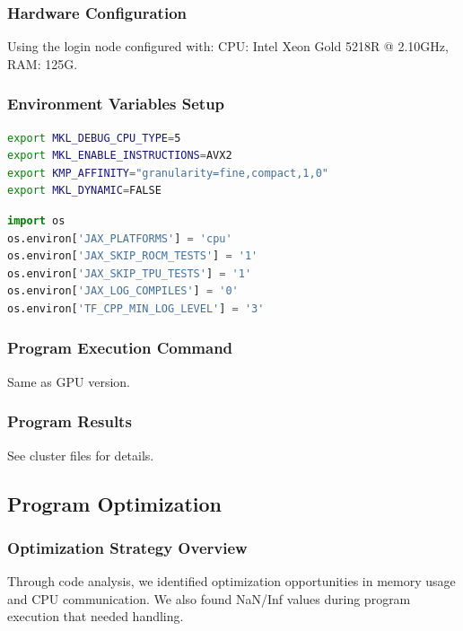 \documentclass[a4paper,12pt]{article}
\begin{document}
\subsubsection{Hardware Configuration}
Using the login node configured with: CPU: Intel Xeon Gold 5218R @ 2.10GHz, RAM: 125G.

\subsubsection{Environment Variables Setup}
\begin{lstlisting}[language=bash]
export MKL_DEBUG_CPU_TYPE=5
export MKL_ENABLE_INSTRUCTIONS=AVX2
export KMP_AFFINITY="granularity=fine,compact,1,0"
export MKL_DYNAMIC=FALSE
\end{lstlisting}
\begin{lstlisting}[language=python]
import os
os.environ['JAX_PLATFORMS'] = 'cpu'
os.environ['JAX_SKIP_ROCM_TESTS'] = '1'
os.environ['JAX_SKIP_TPU_TESTS'] = '1'
os.environ['JAX_LOG_COMPILES'] = '0'
os.environ['TF_CPP_MIN_LOG_LEVEL'] = '3'
\end{lstlisting}

\subsubsection{Program Execution Command}
Same as GPU version.

\subsubsection{Program Results}
See cluster files for details.

\subsection{Program Optimization}

\subsubsection{Optimization Strategy Overview}
Through code analysis, we identified optimization opportunities in memory usage and CPU communication. We also found NaN/Inf values during program execution that needed handling.
\end{document}
